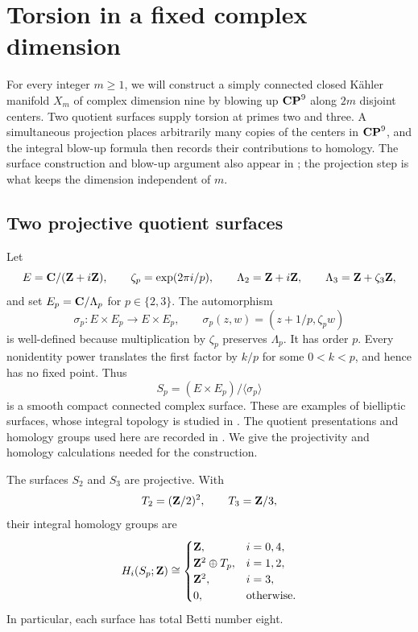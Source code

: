 \section{Torsion in a fixed complex dimension}
\label{geo:section}
\label{sec:geometry}

For every integer $m\geq1$, we will construct a simply connected closed
K\"ahler manifold $X_m$ of complex dimension nine by blowing up $\mathbf{CP}^9$
along $2m$ disjoint centers. Two quotient surfaces supply torsion at
primes two and three. A simultaneous projection places arbitrarily many
copies of the centers in $\mathbf{CP}^9$, and the integral blow-up formula then
records their contributions to homology. The surface construction and
blow-up argument also appear in \cite[Section~3]{OpenAICompanion}; the
projection step is what keeps the dimension independent of $m$.

\subsection{Two projective quotient surfaces}

Let
\[
 E=\mathbf C/(\mathbf Z+i\mathbf Z),\qquad
 \zeta_p=\exp(2\pi i/p),\qquad
 \Lambda_2=\mathbf Z+i\mathbf Z,\qquad \Lambda_3=\mathbf Z+\zeta_3\mathbf Z,
\]
and set $E_p=\mathbf C/\Lambda_p$ for $p\in\{2,3\}$. The automorphism
\[
 \sigma_p:E\times E_p\longrightarrow E\times E_p,
 \qquad \sigma_p(z,w)=(z+1/p,\zeta_p w)
\]
is well-defined because multiplication by $\zeta_p$ preserves
$\Lambda_p$. It has order $p$. Every nonidentity power translates the
first factor by $k/p$ for some $0<k<p$, and hence has no fixed point.
Thus
\[
 S_p=(E\times E_p)/\langle\sigma_p\rangle
\]
is a smooth compact connected complex surface. These are examples of
bielliptic surfaces, whose integral topology is studied in
\cite[Theorem~4.3]{Serrano1991}. The quotient presentations and homology
groups used here are recorded in \cite[Sections~2.2--2.3]{Blomme2025}.
We give the projectivity and homology calculations needed for the
construction.

\begin{lemma}
\label{geo:surfaces}
The surfaces $S_2$ and $S_3$ are projective. With
\[
 T_2=(\mathbf Z/2)^2,\qquad T_3=\mathbf Z/3,
\]
their integral homology groups are
\begin{equation}
\label{geo:surface-homology}
 H_i(S_p;\mathbf Z)\cong
 \begin{cases}
  \mathbf Z,&i=0,4,\\
  \mathbf Z^2\oplus T_p,&i=1,2,\\
  \mathbf Z^2,&i=3,\\
  0,&\text{otherwise}.
 \end{cases}
\end{equation}
In particular, each surface has total Betti number eight.
\end{lemma}

